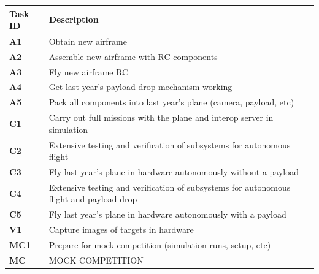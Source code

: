 \documentclass[]{auvsi_doc}
\begin{document}
\begin{center}
	\bgroup
	\def\arraystretch{1.25}%
	\begin{longtable}{P{2cm}P{13cm}}
		\hline
		\textbf{Task ID} 	& \textbf{Description} \\
		\hline
		\textbf{A1} & Obtain new airframe \\
		\textbf{A2} & Assemble new airframe with RC components \\
		\textbf{A3} & Fly new airframe RC \\
		\textbf{A4} & Get last year's payload drop mechanism working \\
		\textbf{A5} & Pack all components into last year's plane (camera, payload, etc) \\
		\textbf{C1} & Carry out full missions with the plane and interop server in simulation  \\
		\textbf{C2} & Extensive testing and verification of subsystems for autonomous flight \\
		\textbf{C3} & Fly last year's plane in hardware autonomously without a payload \\
		\textbf{C4} & Extensive testing and verification of subsystems for autonomous flight and payload drop \\
		\textbf{C5} & Fly last year's plane in hardware autonomously with a payload \\
		\textbf{V1} & Capture images of targets in hardware \\
		\textbf{MC1} & Prepare for mock competition (simulation runs, setup, etc) \\
		\textbf{MC} & MOCK COMPETITION \\
		\hline
	\end{longtable}
	\egroup
\end{center}
\end{document}
